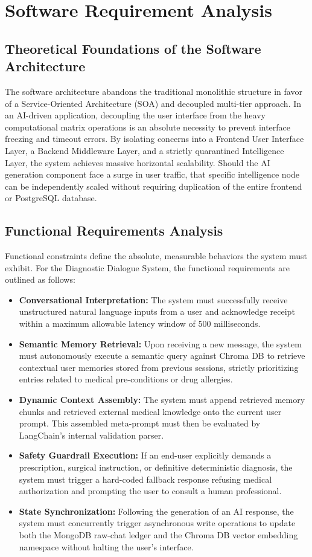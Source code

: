 \documentclass[12pt]{article}
\begin{document}
\newpage
\section{Software Requirement Analysis}

\subsection{Theoretical Foundations of the Software Architecture}
The software architecture abandons the traditional monolithic structure in favor of a Service-Oriented Architecture (SOA) and decoupled multi-tier approach. In an AI-driven application, decoupling the user interface from the heavy computational matrix operations is an absolute necessity to prevent interface freezing and timeout errors. By isolating concerns into a Frontend User Interface Layer, a Backend Middleware Layer, and a strictly quarantined Intelligence Layer, the system achieves massive horizontal scalability. Should the AI generation component face a surge in user traffic, that specific intelligence node can be independently scaled without requiring duplication of the entire frontend or PostgreSQL database.

\subsection{Functional Requirements Analysis}
Functional constraints define the absolute, measurable behaviors the system must exhibit. For the Diagnostic Dialogue System, the functional requirements are outlined as follows:

\begin{itemize}
    \item \textbf{Conversational Interpretation:} The system must successfully receive unstructured natural language inputs from a user and acknowledge receipt within a maximum allowable latency window of 500 milliseconds.
    \item \textbf{Semantic Memory Retrieval:} Upon receiving a new message, the system must autonomously execute a semantic query against Chroma DB to retrieve contextual user memories stored from previous sessions, strictly prioritizing entries related to medical pre-conditions or drug allergies.
    \item \textbf{Dynamic Context Assembly:} The system must append retrieved memory chunks and retrieved external medical knowledge onto the current user prompt. This assembled meta-prompt must then be evaluated by LangChain's internal validation parser.
    \item \textbf{Safety Guardrail Execution:} If an end-user explicitly demands a prescription, surgical instruction, or definitive deterministic diagnosis, the system must trigger a hard-coded fallback response refusing medical authorization and prompting the user to consult a human professional.
    \item \textbf{State Synchronization:} Following the generation of an AI response, the system must concurrently trigger asynchronous write operations to update both the MongoDB raw-chat ledger and the Chroma DB vector embedding namespace without halting the user's interface.
\end{itemize}
\end{document}
